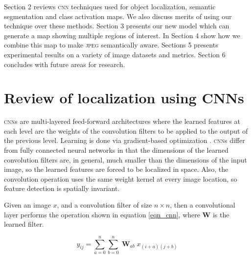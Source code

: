 Section 2 reviews \textsc{cnn} techniques used for object localization, semantic segmentation and class activation maps. We also discuss merits of using our technique over these methods.
Section 3 presents our new model which can generate a map showing multiple regions of interest. In Section 4 show how we combine this map to make \textsc{jpeg} semantically aware.
Sections 5 presents experimental results on a variety of image datasets and metrics. Section 6 concludes with future areas for research.


\section{Review of localization using CNNs}

\textsc{cnn}s are multi-layered feed-forward architectures where the learned features at each level are the weights of the convolution filters to be applied to the output of the previous level. Learning is done via gradient-based optimization \cite{lecun1995convolutional}.
\textsc{cnn}s differ from fully connected neural networks in that the dimensions of the learned convolution filters are, in general, much smaller than the dimensions of the input image, so the learned features are forced to be localized in space. Also, the convolution operation uses the same weight kernel at every image location, so feature detection is spatially invariant.


Given an image $x$, and a convolution filter of size $n \times n$, then a convolutional layer performs the operation shown in equation \ref{eqn_cnn}, where $\mathbf{W}$ is the learned filter.

\begin{equation}
    y_{ij} = \sum_{a=0}^{n} \sum_{b=0}^{n} \; \mathbf{W}_{ab} \; x_{(i+a)(j+b)}
    \label{eqn_cnn}
\end{equation}

